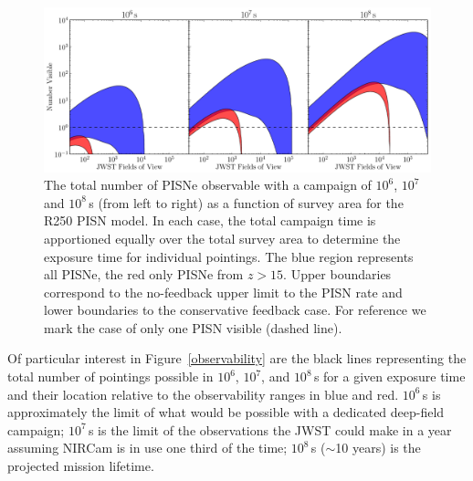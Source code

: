 \documentclass{thesis}
\newcommand{\about}{\ensuremath{\sim}}
\newcommand{\RefFig}[1]{\mbox{Figure~\ref{#1}}}
\begin{document}
\begin{figure}
\begin{center}
  \includegraphics[width=\textwidth]{area_observability_R250}
  \caption{\footnotesize The total number of PISNe observable with a
    campaign of $10^6$, $10^7$ and $10^8\,$s (from left to right) as a
    function of survey area for the R250 PISN model.  In each case,
    the total campaign time is apportioned equally over the total
    survey area to determine the exposure time for individual
    pointings.  The blue region represents all PISNe, the red only
    PISNe from $z>15$.  Upper boundaries correspond to the no-feedback
    upper limit to the PISN rate and lower boundaries to the
    conservative feedback case. For reference we mark the case of only
    one PISN visible (dashed line).}
 \label{area_obsR250}
\end{center}
\end{figure}  
Of particular interest in \RefFig{observability} are the black lines
representing the total number of pointings possible in $10^6$, $10^7$,
and $10^8\,$s for a given exposure time and their location relative to
the observability ranges in blue and red.  $10^6\,$s is approximately
the limit of what would be possible with a dedicated deep-field
campaign; $10^7\,$s is the limit of the observations the JWST could
make in a year assuming NIRCam is in use one third of the time;
$10^8\,$s (\about10 years) is the projected mission lifetime. 
\end{document}
